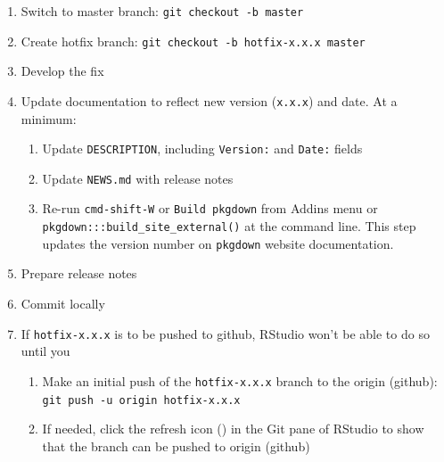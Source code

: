 \documentclass{article}
\begin{document}
\begin{enumerate}

  \item Switch to master branch: \texttt{git checkout -b master} 

  \item Create hotfix branch: \texttt{git checkout -b hotfix-x.x.x master} 
	
  \item Develop the fix
	
  \item Update documentation to reflect new version (\texttt{x.x.x}) and date.
        At a minimum:
  \begin{enumerate}

    \item Update \texttt{DESCRIPTION}, including \texttt{Version:} and \texttt{Date:} fields 

    \item Update \texttt{NEWS.md} with release notes
	
	\item Re-run \texttt{cmd-shift-W} or \texttt{Build pkgdown} from Addins menu or \\
		  \verb#pkgdown:::build_site_external()# at the command line.
		  This step updates the version number on \texttt{pkgdown} website documentation. 

  \end{enumerate}
  \item Prepare release notes
  
  \item Commit locally
	
  \item If \texttt{hotfix-x.x.x} is to be pushed to github, RStudio won't be able to do so until you
  \begin{enumerate}

    \item Make an initial push of the \texttt{hotfix-x.x.x} branch
  	      to the origin (github):
  		  \texttt{git push -u origin hotfix-x.x.x} 
		  
	\item If needed, click the refresh icon 
  		  () in the Git pane of RStudio to 
  		  show that the branch can be pushed to origin (github)


\end{enumerate}
\end{enumerate}
\end{document}
